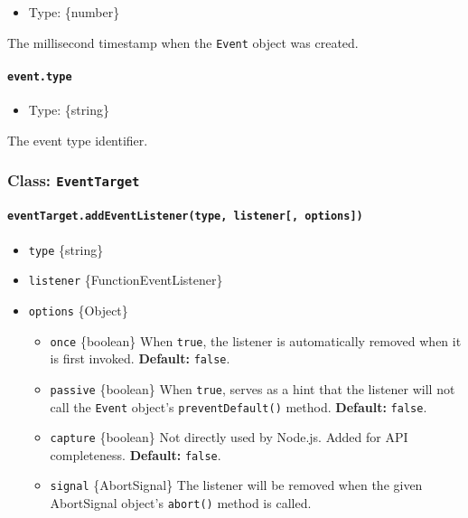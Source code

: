 \begin{itemize}
\tightlist
\item
  Type: \{number\}
\end{itemize}

The millisecond timestamp when the \texttt{Event} object was created.

\paragraph{\texorpdfstring{\texttt{event.type}}{event.type}}\label{event.type}

\begin{itemize}
\tightlist
\item
  Type: \{string\}
\end{itemize}

The event type identifier.

\subsubsection{\texorpdfstring{Class:
\texttt{EventTarget}}{Class: EventTarget}}\label{class-eventtarget}

\paragraph{\texorpdfstring{\texttt{eventTarget.addEventListener(type,\ listener{[},\ options{]})}}{eventTarget.addEventListener(type, listener{[}, options{]})}}\label{eventtarget.addeventlistenertype-listener-options}

\begin{itemize}
\tightlist
\item
  \texttt{type} \{string\}
\item
  \texttt{listener} \{Function\textbar EventListener\}
\item
  \texttt{options} \{Object\}

  \begin{itemize}
  \tightlist
  \item
    \texttt{once} \{boolean\} When \texttt{true}, the listener is
    automatically removed when it is first invoked. \textbf{Default:}
    \texttt{false}.
  \item
    \texttt{passive} \{boolean\} When \texttt{true}, serves as a hint
    that the listener will not call the \texttt{Event} object's
    \texttt{preventDefault()} method. \textbf{Default:} \texttt{false}.
  \item
    \texttt{capture} \{boolean\} Not directly used by Node.js. Added for
    API completeness. \textbf{Default:} \texttt{false}.
  \item
    \texttt{signal} \{AbortSignal\} The listener will be removed when
    the given AbortSignal object's \texttt{abort()} method is called.
  \end{itemize}
\end{itemize}

